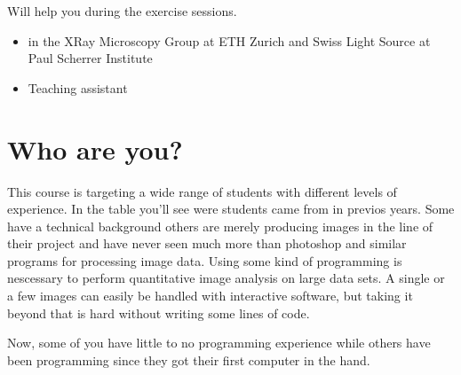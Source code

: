 \documentclass[letterpaper,10pt,english]{sphinxmanual}
\begin{document}
\sphinxAtStartPar
{}



\sphinxAtStartPar
{}

\sphinxAtStartPar
Will help you during the exercise sessions.


\begin{itemize}
\item {} 
\sphinxAtStartPar
{} in the X\sphinxhyphen{}Ray Microscopy Group at ETH Zurich and Swiss Light Source at Paul Scherrer Institute

\item {} 
\sphinxAtStartPar
Teaching assistant

\end{itemize}

\sphinxAtStartPar
{}


\section{Who are you?}
\label{\detokenize{01-Introduction:who-are-you}}
\sphinxAtStartPar
This course is targeting a wide range of students with different levels of experience. In the table you’ll see were students came from in previos years. Some have a technical background others are merely producing images in the line of their project and have never seen much more than photoshop and similar programs for processing image data. Using some kind of programming is nescessary to perform quantitative image analysis on large data sets. A single or a few images can easily be handled with interactive software, but taking it beyond that is hard without writing some lines of code.

\sphinxAtStartPar
Now, some of you have little to no programming experience while others have been programming since they got their first computer in the hand.
\end{document}
